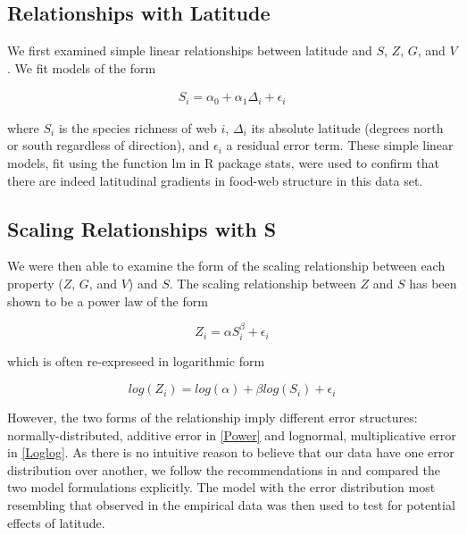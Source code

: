 \documentclass[12pt]{article}
\begin{document}
\subsection*{Relationships with Latitude}

We first examined simple linear relationships between latitude and $S$, $Z$, $G$, and $V$. We fit models of the form

\begin{eqnarray}
S_{i} = \alpha_{0} + \alpha_{1} \Delta_{i} + \epsilon_{i} 
\end{eqnarray}

where $S_{i}$ is the species richness of web $i$, $\Delta_{i}$ its absolute latitude (degrees north or south 
regardless of direction), and $\epsilon_{i}$ a residual error term.
These simple linear models, fit using the function lm in R \citep{R} package stats, were used to confirm that there are indeed latitudinal gradients in food-web structure in this data set.


\subsection*{Scaling Relationships with S}

We were then able to examine the form of the scaling relationship between each property ($Z$, $G$, and $V$) and $S$.
The scaling relationship between $Z$ and $S$ has been shown to be a power law \citep{Riede2010} of the form 

\begin{equation}
\label{Power}
Z_{i}=\alpha S_{i}^{\beta} + \epsilon_{i} 
\end{equation}

which is often re-expreseed in logarithmic form 

\begin{equation}
\label{Loglog}
log(Z_{i}) = log(\alpha) + \beta log(S_{i}) + \epsilon_{i}  
\end{equation}

However, the two forms of the relationship imply different error structures: normally-distributed, additive error in 
\ref{Power} and lognormal, multiplicative error in \ref{Loglog}. As there is no intuitive reason to believe that our
data have one error distribution over another, we follow the recommendations in \citet{Xiao2011} and compared the two
model formulations explicitly. The model with the error distribution most resembling that observed in the empirical
data was then used to test for potential effects of latitude.
\end{document}
